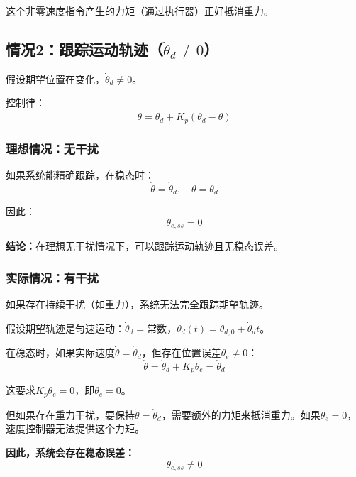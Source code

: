 \documentclass[12pt,a4paper]{article}
\begin{document}
这个非零速度指令产生的力矩（通过执行器）正好抵消重力。

\subsection{情况2：跟踪运动轨迹（$\dot{\theta}_d \neq 0$）}

假设期望位置在变化，$\dot{\theta}_d \neq 0$。

控制律：
\begin{equation}
\dot{\theta} = \dot{\theta}_d + K_p(\theta_d - \theta)
\end{equation}

\subsubsection{理想情况：无干扰}

如果系统能精确跟踪，在稳态时：
\begin{equation}
\dot{\theta} = \dot{\theta}_d, \quad \theta = \theta_d
\end{equation}

因此：
\begin{equation}
\theta_{e,ss} = 0
\end{equation}

\textbf{结论：}在理想无干扰情况下，可以跟踪运动轨迹且无稳态误差。

\subsubsection{实际情况：有干扰}

如果存在持续干扰（如重力），系统无法完全跟踪期望轨迹。

假设期望轨迹是匀速运动：$\dot{\theta}_d = \text{常数}$，$\theta_d(t) = \theta_{d,0} + \dot{\theta}_d t$。

在稳态时，如果实际速度$\dot{\theta} = \dot{\theta}_d$，但存在位置误差$\theta_e \neq 0$：
\begin{equation}
\dot{\theta} = \dot{\theta}_d + K_p \theta_e = \dot{\theta}_d
\end{equation}

这要求$K_p \theta_e = 0$，即$\theta_e = 0$。

但如果存在重力干扰，要保持$\dot{\theta} = \dot{\theta}_d$，需要额外的力矩来抵消重力。如果$\theta_e = 0$，速度控制器无法提供这个力矩。

\textbf{因此，系统会存在稳态误差：}
\begin{equation}
\theta_{e,ss} \neq 0
\end{equation}
\end{document}
